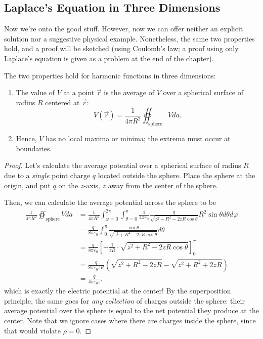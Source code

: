 \subsection{Laplace's Equation in Three Dimensions}

Now we're onto the good stuff. However, now we can offer neither an explicit solution nor a suggestive physical example. Nonetheless, the same two properties hold, and a proof will be sketched (using Coulomb's law; a proof using only Laplace's equation is given as a problem at the end of the chapter).

\begin{proposition}
The two properties hold for harmonic functions in three dimensions:
\begin{enumerate}
    \item The value of $V$ at a point $\vec{r}$ is the average of $V$ over a spherical surface of radius $R$ centered at $\vec{r}$:
    \[V(\vec{r})=\frac{1}{4\pi R^2}\oiint_{\text{sphere}}V da.\]
    \item Hence, $V$ has no local maxima or minima; the extrema must occur at boundaries.
\end{enumerate}
\end{proposition}

\begin{proof}
Let's calculate the average potential over a spherical surface of radius $R$ due to a \textit{single} point charge $q$ located outside the sphere. Place the sphere at the origin, and put $q$ on the $z$-axis, $z$ away from the center of the sphere.

Then, we can calculate the average potential across the sphere to be
\begin{align*}
    \frac{1}{4\pi R^2}\oiint_{\text{sphere}}Vda&=\frac{1}{4\pi R^2}\int_{\varphi=0}^{2\pi}\int_{\theta=0}^\pi \frac{1}{4\pi\varepsilon_0}\frac{q}{\sqrt{z^2+R^2-2zR\cos\theta}}R^2\sin\theta d\theta d\varphi\\
    &=\frac{q}{8\pi \varepsilon_0}\int_0^\pi \frac{\sin\theta}{\sqrt{z^2+R^2-2zR\cos\theta}}d\theta\\
    &=\frac{q}{8\pi\varepsilon_0}\left[-\frac{1}{zR}\cdot \sqrt{z^2+R^2-2zR\cos\theta}\right]_0^\pi\\
    &=\frac{q}{8\pi\varepsilon_0zR}\left(\sqrt{z^2+R^2-2zR}-\sqrt{z^2+R^2+2zR}\right)\\
    &=\frac{q}{4\pi\varepsilon_0z},
\end{align*}
which is exactly the electric potential at the center! By the superposition principle, the same goes for \textit{any collection} of charges outside the sphere: their average potential over the sphere is equal to the net potential they produce at the center. Note that we ignore cases where there are charges inside the sphere, since that would violate $\rho=0$.
\end{proof}

